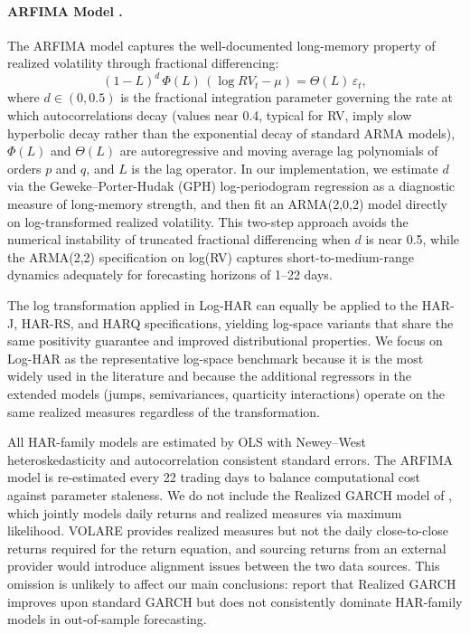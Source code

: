 \documentclass[12pt]{article}
\begin{document}
\paragraph{ARFIMA Model \citep{granger1980, hosking1981}.}
The ARFIMA model captures the well-documented long-memory property of realized volatility through fractional differencing:
\begin{equation}
  (1 - L)^d\, \Phi(L)\,(\log RV_t - \mu) = \Theta(L)\,\varepsilon_t,
  \label{eq:arfima}
\end{equation}
where $d \in (0, 0.5)$ is the fractional integration parameter governing the rate at which autocorrelations decay (values near 0.4, typical for RV, imply slow hyperbolic decay rather than the exponential decay of standard ARMA models), $\Phi(L)$ and $\Theta(L)$ are autoregressive and moving average lag polynomials of orders $p$ and $q$, and $L$ is the lag operator. In our implementation, we estimate $d$ via the Geweke--Porter-Hudak (GPH) log-periodogram regression \citep{geweke1983} as a diagnostic measure of long-memory strength, and then fit an ARMA(2,0,2) model directly on log-transformed realized volatility. This two-step approach avoids the numerical instability of truncated fractional differencing when $d$ is near 0.5, while the ARMA(2,2) specification on log(RV) captures short-to-medium-range dynamics adequately for forecasting horizons of 1--22 days.

The log transformation applied in Log-HAR can equally be applied to the HAR-J, HAR-RS, and HARQ specifications, yielding log-space variants that share the same positivity guarantee and improved distributional properties. We focus on Log-HAR as the representative log-space benchmark because it is the most widely used in the literature and because the additional regressors in the extended models (jumps, semivariances, quarticity interactions) operate on the same realized measures regardless of the transformation.

All HAR-family models are estimated by OLS with Newey--West \citep{newey1987} heteroskedasticity and autocorrelation consistent standard errors. The ARFIMA model is re-estimated every 22 trading days to balance computational cost against parameter staleness. We do not include the Realized GARCH model of \citet{hansen2012}, which jointly models daily returns and realized measures via maximum likelihood. VOLARE provides realized measures but not the daily close-to-close returns required for the return equation, and sourcing returns from an external provider would introduce alignment issues between the two data sources. This omission is unlikely to affect our main conclusions: \citet{hansen2012} report that Realized GARCH improves upon standard GARCH but does not consistently dominate HAR-family models in out-of-sample forecasting.
\end{document}

